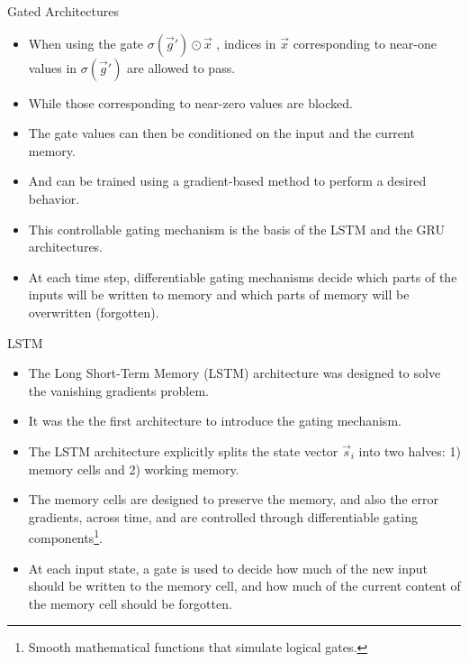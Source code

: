 \documentclass[handout]{beamer}
\begin{document}
\begin{frame}{Gated Architectures}
\begin{scriptsize}

\begin{itemize}
\item When using the gate $\sigma(\vec{g}')\odot \vec{x}$ , indices in $\vec{x}$ corresponding to near-one values in $\sigma(\vec{g}')$ are allowed to pass.
\item While those corresponding to near-zero values are blocked. 
\item The gate values can then be conditioned on the input and the current memory.
\item And can be trained using a gradient-based method to perform a desired behavior.
\item This controllable gating mechanism is the basis of the LSTM and the GRU architectures.
\item At each time step, differentiable gating mechanisms decide which parts of the inputs will be written to memory and which parts of memory will be overwritten (forgotten). 
\end{itemize}
\end{scriptsize}
\end{frame}


\begin{frame}{LSTM}
\begin{scriptsize}

\begin{itemize}
\item The Long Short-Term Memory (LSTM) architecture \cite{hochreiter1997long} was designed to solve the vanishing gradients problem. 
\item It was the the first architecture to introduce the gating mechanism.
\item The LSTM architecture explicitly splits the state vector $\vec{s}_i$ into two halves: 1) memory cells and 2) working memory.
\item The memory cells are designed to preserve the memory, and also the error gradients, across time, and are controlled through differentiable gating components\footnote{Smooth mathematical functions that simulate logical gates.}.
\item At each input state, a gate is used to decide how much of the new input should be written to the memory cell, and how much of the current content of the memory cell should be forgotten.
\end{itemize}
\end{scriptsize}
\end{frame}
\end{document}
